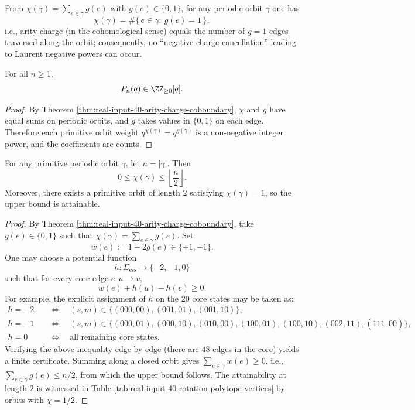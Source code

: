 \begin{remark}\label{rem:real-input-40-arity-charge-pure-counting}
From $\chi(\gamma)=\sum_{e\in\gamma}g(e)$ with $g(e)\in\{0,1\}$, for any periodic orbit $\gamma$ one has
\[
\chi(\gamma)=\#\{\,e\in\gamma:\ g(e)=1\,\},
\]
i.e., arity-charge (in the cohomological sense) equals the number of $g=1$ edges traversed along the orbit; consequently, no ``negative charge cancellation'' leading to Laurent negative powers can occur.
\end{remark}

\begin{corollary}\label{cor:real-input-40-arity-charge-no-laurent}
For all $n\ge 1$,
\[
P_n(q)\in\ZZ_{\ge 0}[q].
\]
\end{corollary}

\begin{proof}
By Theorem \ref{thm:real-input-40-arity-charge-coboundary}, $\chi$ and $g$ have equal sums on periodic orbits, and $g$ takes values in $\{0,1\}$ on each edge.
Therefore each primitive orbit weight $q^{\chi(\gamma)}=q^{g(\gamma)}$ is a non-negative integer power, and the coefficients are counts.
\end{proof}

\begin{theorem}\label{thm:real-input-40-arity-charge-density-bound}
For any primitive periodic orbit $\gamma$, let $n=|\gamma|$. Then
\[
0\le \chi(\gamma)\le \left\lfloor \frac{n}{2}\right\rfloor.
\]
Moreover, there exists a primitive orbit of length $2$ satisfying $\chi(\gamma)=1$, so the upper bound is attainable.
\end{theorem}

\begin{proof}
By Theorem \ref{thm:real-input-40-arity-charge-coboundary}, take $g(e)\in\{0,1\}$ such that $\chi(\gamma)=\sum_{e\in\gamma}g(e)$.
Set
\[
w(e):=1-2g(e)\in\{+1,-1\}.
\]
One may choose a potential function
\[
h:\Sigma_{\mathrm{ess}}\to\{-2,-1,0\}
\]
such that for every core edge $e:u\to v$,
\[
w(e)+h(u)-h(v)\ge 0.
\]
For example, the explicit assignment of $h$ on the $20$ core states may be taken as:
\[
\begin{aligned}
h=-2&\quad\Longleftrightarrow\quad (s,m)\in\{(000,00),(001,01),(001,10)\},\\
h=-1&\quad\Longleftrightarrow\quad (s,m)\in\{(000,01),(000,10),(010,00),(100,01),(100,10),(002,11),(11\overline{1},00)\},\\
h=0&\quad\Longleftrightarrow\quad \text{all remaining core states}.
\end{aligned}
\]
Verifying the above inequality edge by edge (there are $48$ edges in the core) yields a finite certificate.
Summing along a closed orbit gives $\sum_{e\in\gamma}w(e)\ge 0$, i.e., $\sum_{e\in\gamma}g(e)\le n/2$, from which the upper bound follows.
The attainability at length $2$ is witnessed in Table \ref{tab:real-input-40-rotation-polytope-vertices} by orbits with $\bar\chi=1/2$.
\end{proof}

